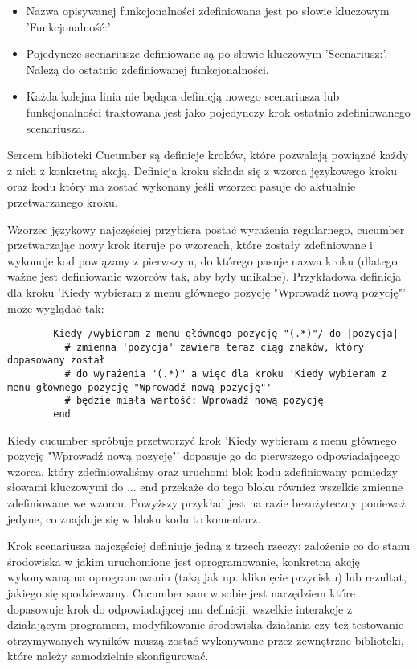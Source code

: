         \begin{itemize}
          \item Nazwa opisywanej funkcjonalności zdefiniowana jest po słowie kluczowym 'Funkcjonalność:'
          \item Pojedyncze scenariusze definiowane są po słowie kluczowym 'Scenariusz:'. Należą do ostatnio zdefiniowanej funkcjonalności.
          \item Każda kolejna linia nie będąca definicją nowego scenariusza lub funkcjonalności traktowana jest jako pojedynczy krok ostatnio zdefiniowanego scenariusza.
        \end{itemize}
        
      Sercem biblioteki Cucumber są definicje kroków, które pozwalają powiązać każdy z nich z konkretną akcją. Definicja kroku składa się z wzorca językowego kroku oraz kodu który ma zostać wykonany jeśli wzorzec pasuje do aktualnie przetwarzanego kroku.
      
      Wzorzec językowy najczęściej przybiera postać wyrażenia regularnego, cucumber przetwarzając nowy krok iteruje po wzorcach, które zostały zdefiniowane i wykonuje kod powiązany z pierwszym, do którego pasuje nazwa kroku (dlatego ważne jest definiowanie wzorców tak, aby były unikalne). Przykładowa definicja dla kroku 'Kiedy wybieram z menu głównego pozycję "Wprowadź nową pozycję"' może wyglądać tak:
      
      \begin{verbatim}
        Kiedy /wybieram z menu głównego pozycję "(.*)"/ do |pozycja|
          # zmienna 'pozycja' zawiera teraz ciąg znaków, który dopasowany został
          # do wyrażenia "(.*)" a więc dla kroku 'Kiedy wybieram z menu głównego pozycję "Wprowadź nową pozycję"'
          # będzie miała wartość: Wprowadź nową pozycję
        end
      \end{verbatim}
      
      Kiedy cucumber spróbuje przetworzyć krok 'Kiedy wybieram z menu głównego pozycję "Wprowadź nową pozycję"' dopasuje go do pierwszego odpowiadającego wzorca, który zdefiniowaliśmy oraz uruchomi blok kodu zdefiniowany pomiędzy słowami kluczowymi do ... end przekaże do tego bloku również wszelkie zmienne zdefiniowane we wzorcu. Powyższy przykład jest na razie bezużyteczny ponieważ jedyne, co znajduje się w bloku kodu to komentarz.
      
      Krok scenariusza najczęściej definiuje jedną z trzech rzeczy: założenie co do stanu środowiska w jakim uruchomione jest oprogramowanie, konkretną akcję wykonywaną na oprogramowaniu (taką jak np. kliknięcie przycisku) lub rezultat, jakiego się spodziewamy. Cucumber sam w sobie jest narzędziem które dopasowuje krok do odpowiadającej mu definicji, wszelkie interakcje z działającym programem, modyfikowanie środowiska działania czy też testowanie otrzymywanych wyników muszą zostać wykonywane przez zewnętrzne biblioteki, które należy samodzielnie skonfigurować.
      
